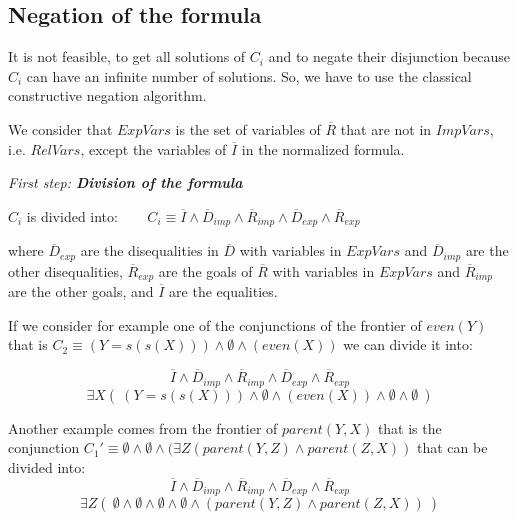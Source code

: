 \documentclass{tlp}
\begin{document}
 

\vspace{-0.1in}

\subsection{Negation of the formula}
\label{negation}

It is not feasible, to get all solutions of $C_i$ and to negate their
disjunction because $C_i$ can have an infinite number of solutions. So,
we have to use the classical constructive negation algorithm.

We consider that $ExpVars$ is the set of variables of $\overline{R}$
that are not in $ImpVars$, i.e. $RelVars$, except the variables of
$\overline{I}$ in the normalized formula.
\medskip

\noindent
{\em First step: {\bf Division of the formula}}

\noindent
$C_i$ is divided into: $~~~~~~~~C_i \equiv \overline{I} \wedge
        \overline{D}_{imp} \wedge \overline{R}_{imp} \wedge
        \overline{D}_{exp} \wedge \overline{R}_{exp} $

\noindent
where $\overline{D}_{exp}$ are the disequalities in $\overline{D}$
with variables in $ExpVars$ and $\overline{D}_{imp}$ are the other
disequalities, $\overline{R}_{exp}$ are the goals of $\overline{R}$
with variables in $ExpVars$ and $\overline{R}_{imp}$ are the other
goals, and $\overline{I}$ are the equalities.

If we consider for example one of the conjunctions of the frontier of
$even(Y)$ that is $C_2 \equiv ( Y=s(s(X)) ) \wedge \emptyset \wedge ( even(X)
)$ we can divide it into:

\[\overline{I} \wedge
        \overline{D}_{imp} \wedge \overline{R}_{imp} \wedge
        \overline{D}_{exp} \wedge \overline{R}_{exp} \]
\[\exists X (~ ( Y=s(s(X)) )
       \wedge \emptyset \wedge ( even(X))  \wedge \emptyset \wedge \emptyset~) \]

Another example comes from the frontier of $parent(Y,X)$ that is the
conjunction $C_1' \equiv \emptyset \wedge \emptyset \wedge (\exists Z
(parent(Y,Z) \wedge parent(Z,X) )$ that can be divided into:
\[\overline{I} \wedge
        \overline{D}_{imp} \wedge \overline{R}_{imp} \wedge
        \overline{D}_{exp} \wedge \overline{R}_{exp}  \]
\[\exists Z (~ \emptyset
        \wedge \emptyset \wedge \emptyset  \wedge \emptyset \wedge 
(parent(Y,Z) \wedge parent(Z,X) ) ~) \]
\end{document}
